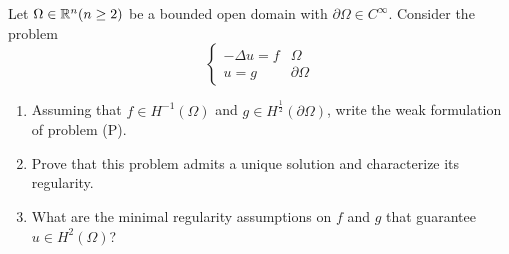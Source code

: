 \newpage
\begin{exercise}
    Let \(\Omega \in \mathbb{R}^n (n \geq 2)\) be a bounded open domain with \(\partial\Omega \in C^\infty\). Consider the problem
    \[
        \begin{cases}
            -\Delta u = f & \Omega         \\
            u = g         & \partial\Omega
        \end{cases}
        \tag*{(P)}
    \]
    \begin{enumerate}
        \item Assuming that \(f \in H^{-1}(\Omega)\) and \(g \in
              H^{\frac{1}{2}}(\partial\Omega)\), write the weak formulation of problem (P).
        \item Prove that this problem admits a unique solution and characterize its
              regularity.
        \item What are the minimal regularity assumptions on \(f\) and \(g\) that guarantee
              \(u \in H^2(\Omega)\)?
    \end{enumerate}
\end{exercise}
